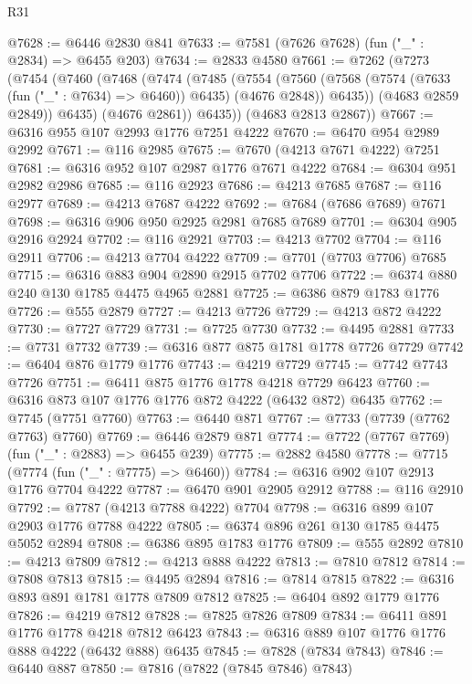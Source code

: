 \begin{lexlean}{R31}
\begin{coremodule}
@7628 := @6446 @2830 @841
@7633 := @7581 (@7626 @7628) (fun ("_" : @2834) => @6455 @203)
@7634 := @2833 @4580
@7661 := @7262
    (@7273
      (@7454
        (@7460
          (@7468
            (@7474
              (@7485
                (@7554
                  (@7560
                    (@7568 (@7574 (@7633 (fun ("_" : @7634) => @6460)) @6435) (@4676 @2848))
                    @6435))
                (@4683 @2859 @2849))
              @6435)
            (@4676 @2861))
          @6435))
      (@4683 @2813 @2867))
@7667 := @6316 @955 @107 @2993 @1776 @7251 @4222
@7670 := @6470 @954 @2989 @2992
@7671 := @116 @2985
@7675 := @7670 (@4213 @7671 @4222) @7251
@7681 := @6316 @952 @107 @2987 @1776 @7671 @4222
@7684 := @6304 @951 @2982 @2986
@7685 := @116 @2923
@7686 := @4213 @7685
@7687 := @116 @2977
@7689 := @4213 @7687 @4222
@7692 := @7684 (@7686 @7689) @7671
@7698 := @6316 @906 @950 @2925 @2981 @7685 @7689
@7701 := @6304 @905 @2916 @2924
@7702 := @116 @2921
@7703 := @4213 @7702
@7704 := @116 @2911
@7706 := @4213 @7704 @4222
@7709 := @7701 (@7703 @7706) @7685
@7715 := @6316 @883 @904 @2890 @2915 @7702 @7706
@7722 := @6374 @880 @240 @130 @1785 @4475 @4965 @2881
@7725 := @6386 @879 @1783 @1776
@7726 := @555 @2879
@7727 := @4213 @7726
@7729 := @4213 @872 @4222
@7730 := @7727 @7729
@7731 := @7725 @7730
@7732 := @4495 @2881
@7733 := @7731 @7732
@7739 := @6316 @877 @875 @1781 @1778 @7726 @7729
@7742 := @6404 @876 @1779 @1776
@7743 := @4219 @7729
@7745 := @7742 @7743 @7726
@7751 := @6411 @875 @1776 @1778 @4218 @7729 @6423
@7760 := @6316 @873 @107 @1776 @1776 @872 @4222 (@6432 @872) @6435
@7762 := @7745 (@7751 @7760)
@7763 := @6440 @871
@7767 := @7733 (@7739 (@7762 @7763) @7760)
@7769 := @6446 @2879 @871
@7774 := @7722 (@7767 @7769) (fun ("_" : @2883) => @6455 @239)
@7775 := @2882 @4580
@7778 := @7715 (@7774 (fun ("_" : @7775) => @6460))
@7784 := @6316 @902 @107 @2913 @1776 @7704 @4222
@7787 := @6470 @901 @2905 @2912
@7788 := @116 @2910
@7792 := @7787 (@4213 @7788 @4222) @7704
@7798 := @6316 @899 @107 @2903 @1776 @7788 @4222
@7805 := @6374 @896 @261 @130 @1785 @4475 @5052 @2894
@7808 := @6386 @895 @1783 @1776
@7809 := @555 @2892
@7810 := @4213 @7809
@7812 := @4213 @888 @4222
@7813 := @7810 @7812
@7814 := @7808 @7813
@7815 := @4495 @2894
@7816 := @7814 @7815
@7822 := @6316 @893 @891 @1781 @1778 @7809 @7812
@7825 := @6404 @892 @1779 @1776
@7826 := @4219 @7812
@7828 := @7825 @7826 @7809
@7834 := @6411 @891 @1776 @1778 @4218 @7812 @6423
@7843 := @6316 @889 @107 @1776 @1776 @888 @4222 (@6432 @888) @6435
@7845 := @7828 (@7834 @7843)
@7846 := @6440 @887
@7850 := @7816 (@7822 (@7845 @7846) @7843)

\end{coremodule}
\end{lexlean}
